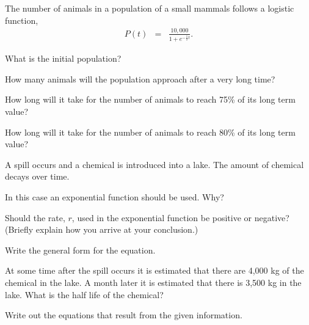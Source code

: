 \begin{problem}
\item The number of animals in a population of a small mammals follows
  a logistic function,
  \begin{eqnarray*}
    P(t) & = & \frac{10,000}{1+e^{-\frac{1}{2}t}}.
  \end{eqnarray*}
  \begin{subproblem}
  \item What is the initial population?
    \vspace{4em}
  \item How many animals will the population approach after a very
    long time?
    \vspace{4em}
  \item How long will it take for the number of animals to reach 75\%
    of its long term value?
    \vfill
  \item How long will it take for the number of animals to reach 80\%
    of its long term value?
    \vfill
  \end{subproblem}

\clearpage

\item A spill occurs and a chemical is introduced into a lake. The
  amount of chemical decays over time. 
  \begin{subproblem}
  \item In this case an exponential function should be used. Why?
    \vspace{2em}

  \item Should the rate, $r$, used in the exponential function be
    positive or negative? (Briefly explain how you arrive at your
    conclusion.)  
    \vspace{2em}

  \item Write the general form for the equation.
    \vspace{2em}

  \item At some time after the spill occurs it is estimated that there
    are 4,000 kg of the chemical in the lake. A month later it is
    estimated that there is 3,500 kg in the lake. What is the half
    life of the chemical?
    \begin{subsubproblem}
    \item Write out the equations that result from the given information.
      \vspace{2em}


\end{subsubproblem}
\end{subproblem}
\end{problem}
